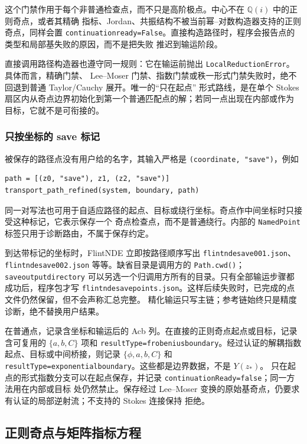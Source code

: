 \documentclass[11pt,a4paper]{ctexart}
\renewcommand{\_}{\origunderscore\allowbreak}
\begin{document}
这个门禁作用于每个非普通检查点，而不只是高阶极点。中心不在 $\mathbb Q(i)$ 中的正则奇点，或者其精确
指标、Jordan、共振结构不被当前幂--对数构造器支持的正则奇点，同样会置
\texttt{continuation\_ready=False}。直接构造路径时，程序会报告点的类型和局部基失败的原因，而不是把失败
推迟到输运阶段。

直接调用路径构造器也遵守同一规则：它在输运前抛出 \texttt{LocalReductionError}。具体而言，精确门禁、
Lee--Moser 门禁、指数门禁或秩一形式门禁失败时，绝不回退到普通 Taylor/Cauchy 展开。唯一的“只在起点”
形式路线，是在单个 Stokes 扇区内从奇点边界初始化到第一个普通匹配点的解；若同一点出现在内部或作为
目标，它就不是可衔接的。

\subsubsection{只按坐标的 save 标记}

被保存的路径点没有用户给的名字，其输入严格是 \texttt{(coordinate, "save")}，例如
\begin{verbatim}
path = [(z0, "save"), z1, (z2, "save")]
transport_path_refined(system, boundary, path)
\end{verbatim}
同一对写法也可用于自适应路径的起点、目标或绕行坐标。奇点作中间坐标时只接受这种标记，它表示保存一个
奇点检查点，而不是普通绕行。内部的 \texttt{NamedPoint} 标签只用于诊断路由，不属于保存约定。

到达带标记的坐标时，FlintNDE 立即按路径顺序写出 \texttt{flintnde\_save\_001.json}、
\texttt{flintnde\_save\_002.json} 等等。缺省目录是调用方的 \texttt{Path.cwd()}；
\texttt{save\_output\_directory} 可以另选一个归调用方所有的目录。只有全部输运步骤都成功后，程序包才写
\texttt{flintnde\_save\_points.json}。这样后续失败时，已完成的点文件仍然保留，但不会声称汇总完整。
精化输运只写主链；参考链始终只是精度诊断，绝不替换用户结果。

在普通点，记录含坐标和输运后的 Acb 列。在直接的正则奇点起点或目标，记录含可复用的 $\{a,b,C\}$ 项和
\texttt{resultType=frobenius\_boundary}。经过认证的解耦指数起点、目标或中间桥接，则记录
$\{\phi,a,b,C\}$ 和 \texttt{resultType=exponential\_boundary}。这些都是边界数据，不是 $Y(z_*)$。
只在起点的形式指数分支可以在起点保存，并记录 \texttt{continuationReady=false}；同一方法用在内部或目标
处仍然禁止。保存经过 Lee--Moser 变换的原始基奇点，仍要求有认证的局部逆射流；不支持的 Stokes 连接保持
拒绝。

\subsection{正则奇点与矩阵指标方程}
\label{subsec:frobenius}
\end{document}
